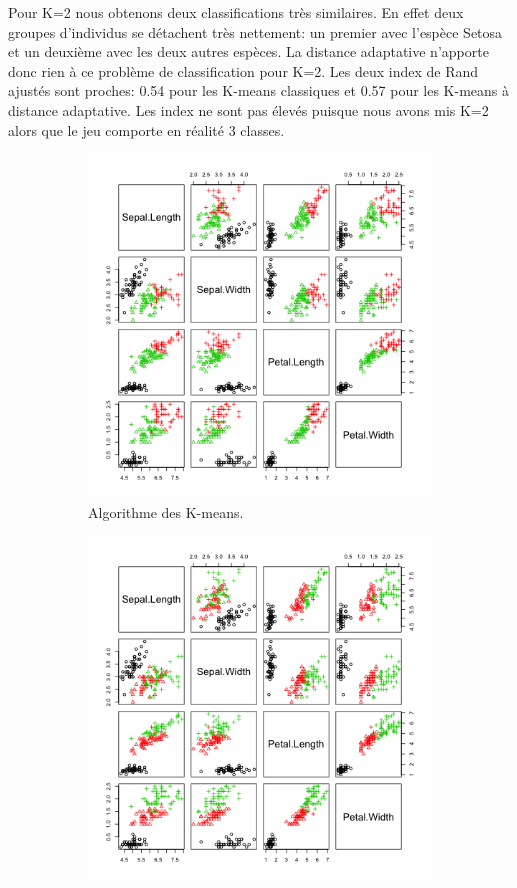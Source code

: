 \documentclass[a4paper,11pt,oneside,roman]{article}
\begin{document}
    Pour K=2 nous obtenons deux classifications très similaires.
    En effet deux groupes d'individus se détachent très nettement: un premier avec l'espèce Setosa et un deuxième avec les deux autres espèces.
    La distance adaptative n'apporte donc rien à ce problème de classification pour K=2.
    Les deux index de Rand ajustés sont proches: 0.54 pour les K-means classiques et 0.57 pour les K-means à distance adaptative.
    Les index ne sont pas élevés puisque nous avons mis K=2 alors que le jeu comporte en réalité 3 classes.

    \begin{figure}
        \centering
        \begin{subfigure}{.5\textwidth}
          \centering
          \includegraphics[width=.8\linewidth]{imgs/K_means_iris_3.png}
          \caption{Algorithme des K-means.}
        \end{subfigure}%
        \begin{subfigure}{.5\textwidth}
          \centering
          \includegraphics[width=.8\linewidth]{imgs/K_means_adapt_iris_3.png}

\end{subfigure}
\end{figure}
\end{document}
